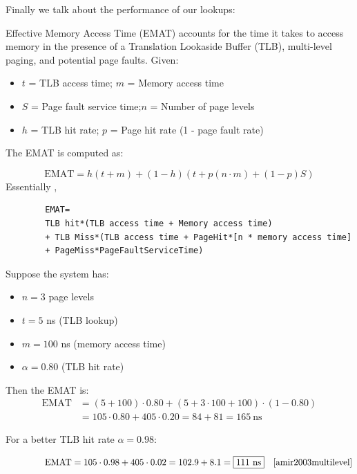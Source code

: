 \newpage 

\noindent
Finally we talk about the performance of our lookups:

\begin{Def}

    Effective Memory Access Time (EMAT) accounts for the time it takes to access memory in the presence of a Translation Lookaside Buffer (TLB), multi-level paging, and potential page faults.
    Given:
    \begin{itemize}
        \item $t$ = TLB access time;\hspace{3.4em} $m$ = Memory access time
        \item $S$ = Page fault service time;\quad $n$ = Number of page levels
        \item $h$ = TLB hit rate;\hspace{5.1em} $p$ = Page hit rate (1 - page fault rate)
    \end{itemize}

    The EMAT is computed as:

    \[
    \text{EMAT} =
    h(t + m) +
    (1 - h)\left(t + p(n \cdot m) + (1 - p)S\right)
    \]
    \noindent
    Essentially \cite{69017},
    \begin{lstlisting}
        EMAT=
        TLB hit*(TLB access time + Memory access time)
        + TLB Miss*(TLB access time + PageHit*[n * memory access time]
        + PageMiss*PageFaultServiceTime)
    \end{lstlisting}
\end{Def}
\begin{Example}

    Suppose the system has:
    \begin{itemize}
        \item $n = 3$ page levels
        \item $t = 5$ ns (TLB lookup)
        \item $m = 100$ ns (memory access time)
        \item $\alpha = 0.80$ (TLB hit rate)
    \end{itemize}

    \noindent
    Then the EMAT is:
    \begin{align*}
    \text{EMAT} &=
    (5 + 100)\cdot 0.80 +
    (5 + 3 \cdot 100 + 100)\cdot (1 - 0.80)\\
    &= 105 \cdot 0.80 + 405 \cdot 0.20 = 84 + 81 = \boxed{165\ \text{ns}}
    \end{align*}

    \noindent
    For a better TLB hit rate $\alpha = 0.98$:
    
    \vspace{-1em}
    \begin{align*}
        \hspace{4.3em}\text{EMAT} =
        105 \cdot 0.98 + 405 \cdot 0.02 = 102.9 + 8.1 = \boxed{111\ \text{ns}}  && \cite{amir2003multilevel}
    \end{align*}
\end{Example}

